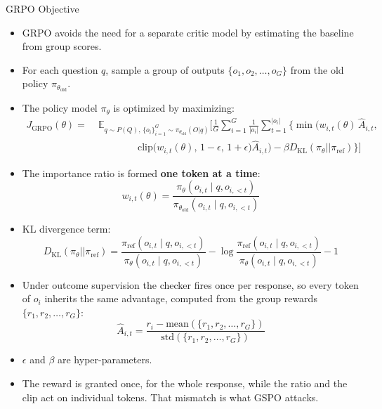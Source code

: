 \begin{frame}[allowframebreaks]{GRPO Objective}
    \begin{itemize}
        \item GRPO avoids the need for a separate critic model by estimating the baseline from group scores.
        \item For each question $q$, sample a group of outputs $\{o_1, o_2, \ldots, o_G\}$ from the old policy $\pi_{\theta_{\text{old}}}$.
        \item The policy model $\pi_\theta$ is optimized by maximizing:
        \begin{equation}
        \begin{split}
            J_{\text{GRPO}}(\theta) =\; & \mathbb{E}_{q \sim P(Q),\, \{o_i\}_{i=1}^G \sim \pi_{\theta_{\text{old}}}(O|q)} \Bigg[
            \frac{1}{G} \sum_{i=1}^G \frac{1}{|o_i|} \sum_{t=1}^{|o_i|} \Bigg\{
                \min \Bigg(
                    w_{i,t}(\theta)\, \hat{A}_{i,t}, \\
                & \qquad\qquad
                    \text{clip}\big(w_{i,t}(\theta),\, 1-\epsilon,\, 1+\epsilon\big) \hat{A}_{i,t}
                \Bigg)
                - \beta D_{\text{KL}}(\pi_\theta || \pi_{\text{ref}})
            \Bigg\}
            \Bigg]
        \end{split}
        \end{equation}
        \item The importance ratio is formed \textbf{one token at a time}:
        \begin{equation}
            w_{i,t}(\theta) = \frac{\pi_\theta(o_{i,t} \mid q, o_{i,<t})}{\pi_{\theta_{\text{old}}}(o_{i,t} \mid q, o_{i,<t})}
        \end{equation}
    \framebreak
        \item KL divergence term:
        \begin{equation}
            D_{\text{KL}}(\pi_\theta || \pi_{\text{ref}}) =
            \frac{\pi_{\text{ref}}(o_{i,t} \mid q, o_{i,<t})}{\pi_\theta(o_{i,t} \mid q, o_{i,<t})} -
            \log \frac{\pi_{\text{ref}}(o_{i,t} \mid q, o_{i,<t})}{\pi_\theta(o_{i,t} \mid q, o_{i,<t})} - 1
        \end{equation}
        \item Under outcome supervision the checker fires once per response, so every token of $o_i$ inherits the same advantage, computed from the group rewards $\{r_1, r_2, \ldots, r_G\}$:
        \begin{equation}
            \hat{A}_{i,t} = \frac{r_i - \text{mean}(\{r_1, r_2, \ldots, r_G\})}{\text{std}(\{r_1, r_2, \ldots, r_G\})}
        \end{equation}
        \item $\epsilon$ and $\beta$ are hyper-parameters.
        \item The reward is granted once, for the whole response, while the ratio and the clip act on individual tokens. That mismatch is what GSPO attacks.
    \end{itemize}
\end{frame}

